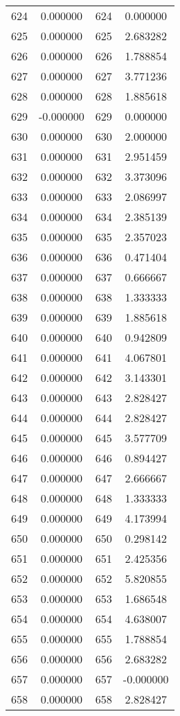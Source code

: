 \documentclass[12pt]{article}
\begin{document}
\begin{longtable}{@{}cccc@{}}
624 & 0.000000 & 624 & 0.000000 \\
625 & 0.000000 & 625 & 2.683282 \\
626 & 0.000000 & 626 & 1.788854 \\
627 & 0.000000 & 627 & 3.771236 \\
628 & 0.000000 & 628 & 1.885618 \\
629 & -0.000000 & 629 & 0.000000 \\
630 & 0.000000 & 630 & 2.000000 \\
631 & 0.000000 & 631 & 2.951459 \\
632 & 0.000000 & 632 & 3.373096 \\
633 & 0.000000 & 633 & 2.086997 \\
634 & 0.000000 & 634 & 2.385139 \\
635 & 0.000000 & 635 & 2.357023 \\
636 & 0.000000 & 636 & 0.471404 \\
637 & 0.000000 & 637 & 0.666667 \\
638 & 0.000000 & 638 & 1.333333 \\
639 & 0.000000 & 639 & 1.885618 \\
640 & 0.000000 & 640 & 0.942809 \\
641 & 0.000000 & 641 & 4.067801 \\
642 & 0.000000 & 642 & 3.143301 \\
643 & 0.000000 & 643 & 2.828427 \\
644 & 0.000000 & 644 & 2.828427 \\
645 & 0.000000 & 645 & 3.577709 \\
646 & 0.000000 & 646 & 0.894427 \\
647 & 0.000000 & 647 & 2.666667 \\
648 & 0.000000 & 648 & 1.333333 \\
649 & 0.000000 & 649 & 4.173994 \\
650 & 0.000000 & 650 & 0.298142 \\
651 & 0.000000 & 651 & 2.425356 \\
652 & 0.000000 & 652 & 5.820855 \\
653 & 0.000000 & 653 & 1.686548 \\
654 & 0.000000 & 654 & 4.638007 \\
655 & 0.000000 & 655 & 1.788854 \\
656 & 0.000000 & 656 & 2.683282 \\
657 & 0.000000 & 657 & -0.000000 \\
658 & 0.000000 & 658 & 2.828427 \\

\end{longtable}
\end{document}
